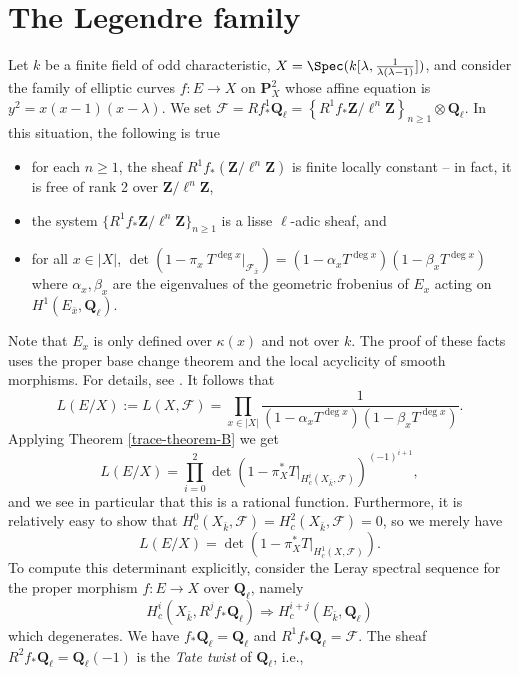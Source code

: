 \section{The Legendre family}
\label{trace-section-legendre-family}
Let $k$ be a finite field of odd characteristic,
$X = \Spec(k[\lambda, \frac{1}{\lambda(\lambda - 1)}])$, and
consider the family of elliptic
curves $f : E \to X$ on $\mathbf{P}^2_X$ whose affine equation is $y^2 =
x(x - 1)(x - \lambda)$. We set $\mathcal{F} = Rf_*^1\mathbf{Q}_\ell =
\left\{R^1f_*\mathbf{Z}/\ell^n\mathbf{Z}\right\}_{n\geq 1} \otimes
\mathbf{Q}_\ell$. In this situation, the following is true
\begin{itemize}
\item for each $n \geq 1$, the sheaf $R^1f_*(\mathbf{Z}/\ell^n\mathbf{Z})$ is
finite locally constant -- in fact, it is free of rank 2 over
$\mathbf{Z}/\ell^n\mathbf{Z}$,
\item the system $\{R^1f_*\mathbf{Z}/\ell^n\mathbf{Z}\}_{n\geq 1}$ is a lisse
$\ell$-adic sheaf, and
\item for all $x\in |X|$,
$\det(1 - \pi_x\ T^{\deg x} |_{\mathcal{F}_{\bar x}}) =
(1 - \alpha_x T^{\deg x})(1 - \beta_x T^{\deg x})$
where $\alpha_x, \beta_x$ are the eigenvalues of the geometric
frobenius of $E_x$ acting on $H^1(E_{\bar x}, \mathbf{Q}_\ell)$.
\end{itemize}
Note that $E_x$ is only defined over $\kappa(x)$ and not over $k$. The proof of
these facts uses the proper base change theorem and the local acyclicity of
smooth morphisms. For details, see \cite{SGA4.5}. It follows that
$$
L(E/X) := L(X, \mathcal{F}) = \prod_{x\in |X|}
\frac{1}{(1-\alpha_xT^{\deg x})(1-\beta_xT^{\deg x })} .
$$
Applying Theorem \ref{trace-theorem-B} we get
$$
L(E/X) =
\prod_{i = 0}^2
\det\left(1 - \pi_X^*T |_{H_c^i(X_{\bar k}, \mathcal{F})}\right)^{(-1)^{i+1}},
$$
and we see in particular that this is a rational function. Furthermore, it is
relatively easy to show that $H_c^0(X_{\bar k}, \mathcal{F}) = H_c^2(X_{\bar
k}, \mathcal{F}) = 0$, so we merely have
$$
L(E/X) = \det(1 - \pi_X^*T |_{H_c^1(X, \mathcal{F})}).
$$
To compute this determinant explicitly, consider the Leray spectral sequence
for the proper morphism $f : E \to X$ over $\mathbf{Q}_\ell$, namely
$$
H_c^i(X_{\bar k}, R^jf_*\mathbf{Q}_\ell) \Rightarrow H_c^{i+j}(E_{\bar
k}, \mathbf{Q}_\ell)
$$
which degenerates. We have $f_*\mathbf{Q}_\ell = \mathbf{Q}_\ell$ and
$R^1f_*\mathbf{Q}_\ell = \mathcal{F}$. The sheaf $R^2f_*\mathbf{Q}_\ell =
\mathbf{Q}_\ell(-1)$ is the {\it Tate twist} of $\mathbf{Q}_\ell$, i.e.,
